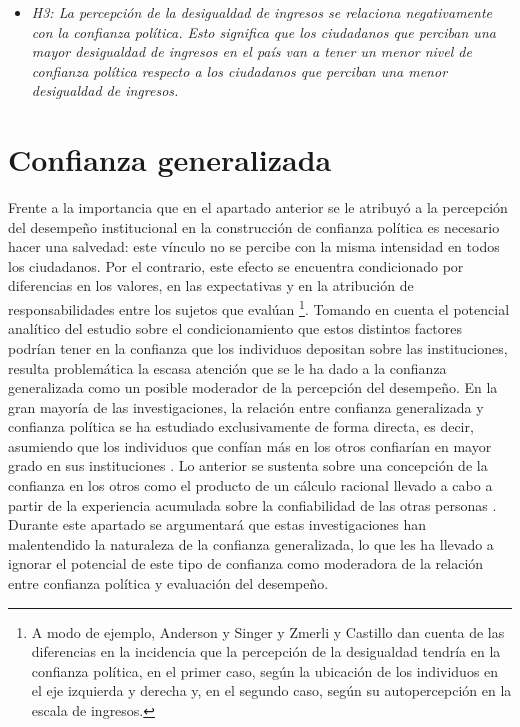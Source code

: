 \documentclass[12pt,twoside]{templates/facsothesis}
\providecommand{\tightlist}{%
  \setlength{\itemsep}{0pt}\setlength{\parskip}{0pt}}
\begin{document}
\begin{itemize}
\tightlist
\item
  \emph{H3: La percepción de la desigualdad de ingresos se relaciona negativamente con la confianza política. Esto significa que los ciudadanos que perciban una mayor desigualdad de ingresos en el país van a tener un menor nivel de confianza política respecto a los ciudadanos que perciban una menor desigualdad de ingresos.}
\end{itemize}

\section{Confianza generalizada}\label{confianza-generalizada}

Frente a la importancia que en el apartado anterior se le atribuyó a la percepción del desempeño institucional en la construcción de confianza política es necesario hacer una salvedad: este vínculo no se percibe con la misma intensidad en todos los ciudadanos. Por el contrario, este efecto se encuentra condicionado por diferencias en los valores, en las expectativas y en la atribución de responsabilidades entre los sujetos que evalúan \citep{vandermeerEconomicPerformancePolitical2018, vandermeerPoliticalTrustEvaluation2017} \footnote{A modo de ejemplo, Anderson y Singer \citeyearpar{andersonSensitiveLeftImpervious2008} y Zmerli y Castillo \citeyearpar{zmerliIncomeInequalityDistributive2015} dan cuenta de las diferencias en la incidencia que la percepción de la desigualdad tendría en la confianza política, en el primer caso, según la ubicación de los individuos en el eje izquierda y derecha y, en el segundo caso, según su autopercepción en la escala de ingresos.}. Tomando en cuenta el potencial analítico del estudio sobre el condicionamiento que estos distintos factores podrían tener en la confianza que los individuos depositan sobre las instituciones, resulta problemática la escasa atención que se le ha dado a la confianza generalizada como un posible moderador de la percepción del desempeño. En la gran mayoría de las investigaciones, la relación entre confianza generalizada y confianza política se ha estudiado exclusivamente de forma directa, es decir, asumiendo que los individuos que confían más en los otros confiarían en mayor grado en sus instituciones \citep{boothLegitimacyPuzzleLatin2009, mainwaringStateDeficienciesParty2006, mattesSocialPoliticalTrust2018, morrisCorruptionTrustTheoretical2010, zmerliWinnersLosersThree2013}. Lo anterior se sustenta sobre una concepción de la confianza en los otros como el producto de un cálculo racional llevado a cabo a partir de la experiencia acumulada sobre la confiabilidad de las otras personas \citep{newtonSocialPoliticalTrust2017}. Durante este apartado se argumentará que estas investigaciones han malentendido la naturaleza de la confianza generalizada, lo que les ha llevado a ignorar el potencial de este tipo de confianza como moderadora de la relación entre confianza política y evaluación del desempeño.
\end{document}
